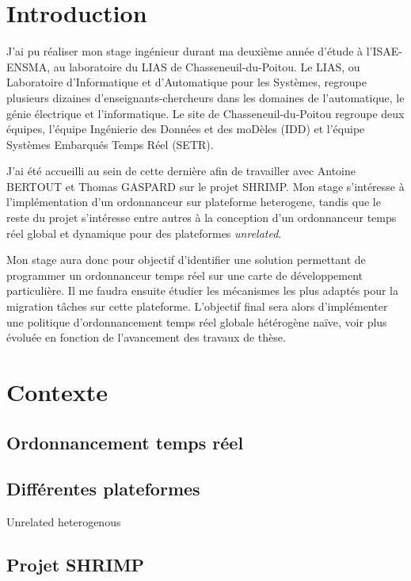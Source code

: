 \documentclass{article}
\begin{document}
    \newpage
    
    \section{Introduction}

    
    J'ai pu réaliser mon stage ingénieur durant ma deuxième année d'étude à l'ISAE-ENSMA, au laboratoire du LIAS de Chasseneuil-du-Poitou. Le LIAS, ou Laboratoire d'Informatique et d'Automatique pour les Systèmes, regroupe plusieurs dizaines d'enseignants-chercheurs dans les domaines de l'automatique, le génie électrique et l'informatique. Le site de Chasseneuil-du-Poitou regroupe deux équipes, l'équipe Ingénierie des Données et des moDèles (IDD) et l'équipe Systèmes Embarqués Temps Réel (SETR). 

    J'ai été accueilli au sein de cette dernière afin de travailler avec \color{red} Antoine BERTOUT et Thomas GASPARD \color{black} sur le projet \gls{SHRIMP}. Mon stage s'intéresse à l'implémentation d'un \gls{ordonnanceur} sur \gls{plateforme heterogene}\cite{bertout2020workload}, tandis que le reste du projet s'intéresse entre autres à la conception d'un \gls{ordonnanceur} temps réel global et dynamique pour des plateformes \textit{unrelated}.

    Mon stage aura donc pour objectif d'identifier une solution permettant de programmer un \gls{ordonnanceur} temps réel sur une carte de développement particulière. Il me faudra ensuite étudier les mécanismes les plus adaptés pour la migration tâches sur cette plateforme. L'objectif final sera alors d'implémenter une politique d'\gls{ordonnancement} temps réel globale hétérogène naïve, voir plus évoluée en fonction de l'avancement des travaux de thèse.
    
    \newpage
    \section{Contexte}
    
    \subsection{Ordonnancement temps réel}

    \subsection{Différentes plateformes}
    Unrelated heterogenous
    \subsection{Projet SHRIMP}
\end{document}
